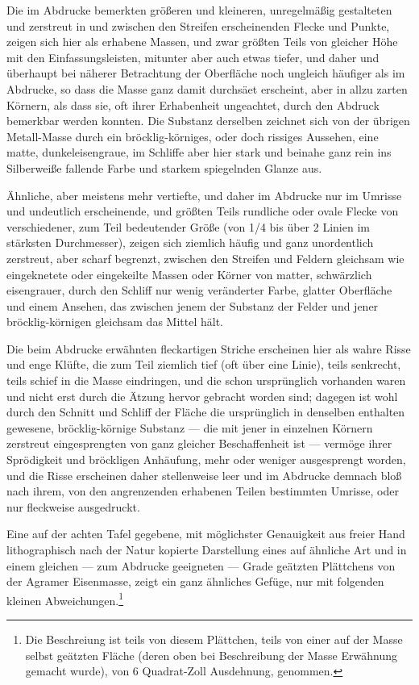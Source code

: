 \documentclass[a4paper, 11pt, oneside, german]{article}
\begin{document}
Die im Abdrucke bemerkten größeren und kleineren, unregelmäßig gestalteten und zerstreut in und zwischen den Streifen erscheinenden Flecke und Punkte, zeigen sich hier als erhabene Massen, und zwar größten Teils von gleicher Höhe mit den Einfassungsleisten, mitunter aber auch etwas tiefer, und daher und überhaupt bei näherer Betrachtung der Oberfläche noch ungleich häufiger als im Abdrucke, so dass die Masse ganz damit durchsäet erscheint, aber in allzu zarten Körnern, als dass sie, oft ihrer Erhabenheit ungeachtet, durch den Abdruck bemerkbar werden konnten. Die Substanz derselben zeichnet sich von der übrigen Metall-Masse durch ein bröcklig-körniges, oder doch rissiges Aussehen, eine matte, dunkeleisengraue, im Schliffe aber hier stark und beinahe ganz rein ins Silberweiße fallende Farbe und starkem spiegelnden Glanze aus.

Ähnliche, aber meistens mehr vertiefte, und daher im Abdrucke nur im Umrisse und undeutlich erscheinende, und größten Teils rundliche oder ovale Flecke von verschiedener, zum Teil bedeutender Größe (von 1/4 bis über 2 Linien im stärksten Durchmesser), zeigen sich ziemlich häufig und ganz unordentlich zerstreut, aber scharf begrenzt, zwischen den Streifen und Feldern gleichsam wie eingeknetete oder eingekeilte Massen oder Körner von matter, schwärzlich eisengrauer, durch den Schliff nur wenig veränderter Farbe, glatter Oberfläche und einem Ansehen, das zwischen jenem der Substanz der Felder und jener bröcklig-körnigen gleichsam das Mittel hält.

Die beim Abdrucke erwähnten fleckartigen Striche erscheinen hier als wahre Risse und enge Klüfte, die zum Teil ziemlich tief (oft über eine Linie), teils senkrecht, teils schief in die Masse eindringen, und die schon ursprünglich vorhanden waren und nicht erst durch die Ätzung hervor gebracht worden sind; dagegen ist wohl durch den Schnitt und Schliff der Fläche die ursprünglich in denselben enthalten gewesene, bröcklig-körnige Substanz --- die mit jener in einzelnen Körnern zerstreut eingesprengten von ganz gleicher Beschaffenheit ist --- vermöge ihrer Sprödigkeit und bröckligen Anhäufung, mehr oder weniger ausgesprengt worden, und die Risse erscheinen daher stellenweise leer und im Abdrucke demnach bloß nach ihrem, von den angrenzenden erhabenen Teilen bestimmten Umrisse, oder nur fleckweise ausgedruckt.

Eine auf der achten Tafel gegebene, mit möglichster Genauigkeit aus freier Hand lithographisch nach der Natur kopierte Darstellung eines auf ähnliche Art und in einem gleichen --- zum Abdrucke geeigneten --- Grade geätzten Plättchens von der Agramer Eisenmasse, zeigt ein ganz ähnliches Gefüge, nur mit folgenden kleinen Abweichungen.\footnote{Die Beschreiung ist teils von diesem Plättchen, teils von einer auf der Masse selbst geätzten Fläche (deren oben bei Beschreibung der Masse Erwähnung gemacht wurde), von 6 Quadrat-Zoll Ausdehnung, genommen.}
\end{document}
